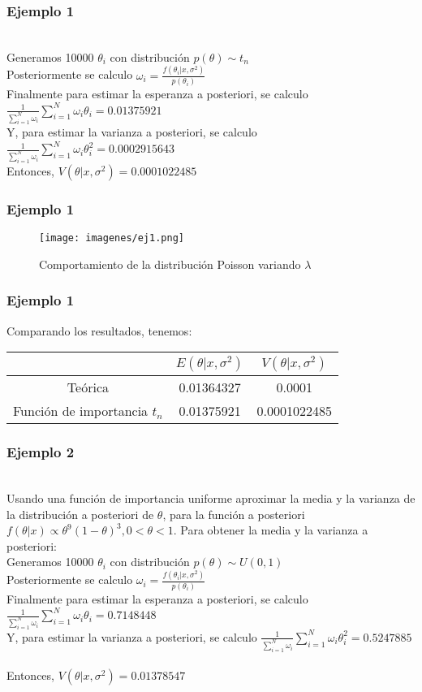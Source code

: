 \documentclass[12pt]{beamer}
\begin{document}
\begin{frame}
\frametitle{Ejemplo 1}
~\\Generamos 10000 $\theta_{i}$ con distribución $p(\theta)\sim t_{n}$
~\\Posteriormente se calculo $\omega_{i}=\frac{f(\theta_{i}|x,\sigma^2)}{p(\theta_{i})}$
~\\Finalmente para estimar la esperanza a posteriori, se calculo $\frac{1}{\sum\limits_{i=1}^{N}\omega_{i}}\sum\limits_{i=1}^{N}\omega_{i}\theta_{i}=0.01375921$
~\\Y, para estimar la varianza a posteriori, se calculo $\frac{1}{\sum\limits_{i=1}^{N}\omega_{i}}\sum\limits_{i=1}^{N}\omega_{i}\theta_{i}^2=0.0002915643$
~\\Entonces, $V(\theta|x,\sigma^2)=0.0001022485$
\end{frame}

\begin{frame}
\frametitle{Ejemplo 1}
\begin{figure}[!h]
    \begin{center}
        \texttt{[image: imagenes/ej1.png]}
        \caption{Comportamiento de la distribución Poisson variando $\lambda$}
        \label{fig:Densidad}
    \end{center}
\end{figure}
\end{frame}

\begin{frame}
\frametitle{Ejemplo 1}
Comparando los resultados, tenemos:
\begin{tabular}{|c|c|c|}
\hline 
 & $E(\theta|x,\sigma^2)$ & $V(\theta|x,\sigma^2)$ \\ 
\hline 
Teórica & 0.01364327 & 0.0001 \\ 
Función de importancia $t_{n}$ &  0.01375921 & 0.0001022485 \\ 
\hline 
\end{tabular} 
\end{frame}

\begin{frame}
\frametitle{Ejemplo 2}
~\\ Usando una función de importancia uniforme aproximar la media y la varianza de la distribución a posteriori de $\theta$, para la función a posteriori $f(\theta|x)\propto \theta^9(1-\theta)^3, 0<\theta<1$. Para obtener la media y la varianza a posteriori:
~\\Generamos 10000 $\theta_{i}$ con distribución $p(\theta)\sim U(0,1)$
~\\Posteriormente se calculo $\omega_{i}=\frac{f(\theta_{i}|x,\sigma^2)}{p(\theta_{i})}$
~\\Finalmente para estimar la esperanza a posteriori, se calculo $\frac{1}{\sum\limits_{i=1}^{N}\omega_{i}}\sum\limits_{i=1}^{N}\omega_{i}\theta_{i}=0.7148448$
~\\Y, para estimar la varianza a posteriori, se calculo $\frac{1}{\sum\limits_{i=1}^{N}\omega_{i}}\sum\limits_{i=1}^{N}\omega_{i}\theta_{i}^2=0.5247885$
~\\Entonces, $V(\theta|x,\sigma^2)=0.01378547$
\end{frame}
\end{document}
